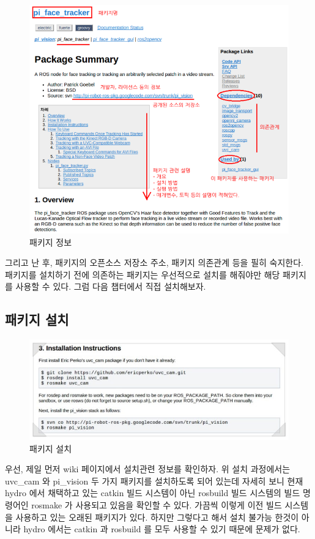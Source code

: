 \begin{figure}[h]
\centering\includegraphics[width=0.9\columnwidth]{pictures/chapter8/openpkg3.png}
\caption{패키지 정보}
\end{figure}

그리고 난 후, 패키지의 오픈소스 저장소 주소, 패키지 의존관계 등을 필히 숙지한다. 패키지를 설치하기 전에 의존하는 패키지는 우선적으로 설치를 해줘야만 해당 패키지를 사용할 수 있다. 그럼 다음 챕터에서 직접 설치해보자.

\subsection{패키지 설치}

\begin{figure}[h]
\centering\includegraphics[width=0.9\columnwidth]{pictures/chapter8/openpkg4.jpg}
\caption{패키지 설치}
\end{figure}

우선, 제일 먼저 wiki 페이지에서 설치관련 정보를 확인하자. 위 설치 과정에서는 uvc\_cam 와 pi\_vision 두 가지 패키지를 설치하도록 되어 있는데 자세히 보니 현재 hydro 에서 채택하고 있는 catkin 빌드 시스템이 아닌 rosbuild 빌드 시스템의 빌드 명령어인 rosmake 가 사용되고 있음을 확인할 수 있다. 가끔씩 이렇게 이전 빌드 시스템을 사용하고 있는 오래된 패키지가 있다. 하지만 그렇다고 해서 설치 불가능 한것이 아니라 hydro 에서는 catkin 과 rosbuild 를 모두 사용할 수 있기 때문에 문제가 없다.


